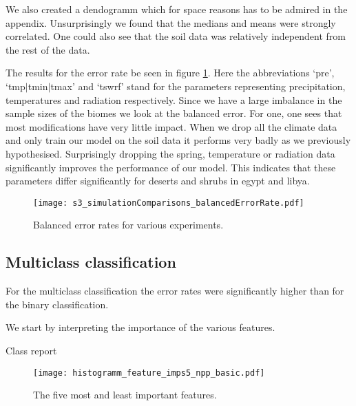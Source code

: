 We also created a dendogramm which for space reasons has to be admired in the appendix.
Unsurprisingly we found that the medians and means were strongly correlated. One could also see that the 
soil data was relatively independent from the rest of the data.

The results for the error rate be seen in figure \ref{pl:s3_simulationComparisons_balancedErrorRate}.
Here the abbreviations `pre', `tmp$|$tmin$|$tmax' and `tswrf' stand for the parameters representing
precipitation, temperatures and radiation respectively.
Since we have a large imbalance in the sample sizes of the biomes we look at the balanced error.
For one, one sees that most modifications have very little impact.
When we drop all the climate data and only train our model on the soil data it performs very badly
as we previously hypothesised. Surprisingly dropping the spring, temperature or radiation data
significantly improves the performance of our model. This indicates that these parameters differ significantly
for deserts and shrubs in egypt and libya.

\begin{figure}[h]
  \begin{minipage}{0.45\textwidth}
    \centering
    \texttt{[image: s3\_simulationComparisons\_balancedErrorRate.pdf]}
    \caption{Balanced error rates for various experiments.}
    \label{pl:s3_simulationComparisons_balancedErrorRate}
  \end{minipage}
\end{figure}


\subsection{Multiclass classification}

For the multiclass classification the error rates were significantly higher
than for the binary classification.

We start by interpreting the importance of the various features.




\begin{table}[h]
  \centering
  
  \caption{Class report}
  \label{tb:s4_basic_classreport}
\end{table}


\begin{figure}
  \centering
  \texttt{[image: histogramm\_feature\_imps5\_npp\_basic.pdf]}
  \caption{The five most and least important features.}
  \label{pl:histogramm_feature_imps5_npp_basic}
\end{figure}

